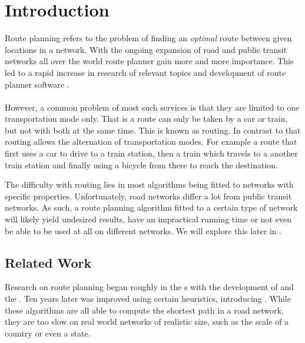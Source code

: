 \chapter{Introduction}\label{introduction}
	Route planning refers to the problem of finding an \textit{optimal} route between given locations in a network.
	With the ongoing expansion of road and public transit networks all over the world route planner gain more and
	more importance. This led to a rapid increase in research 
	of relevant topics and development of route planner software .\\\\
	However, a common problem of most such services is that they are limited to one transportation mode only.
	That is a route can only be taken by a car or train, but not with both at the same time. This is known as \uniModal routing.
	In contrast to that \multiModal routing allows the alternation of transportation modes. For example a route that
	first uses a car to drive to a train station, then a train which travels to a another train station and finally
	using a bicycle from there to reach the destination.
	
	The difficulty with \multiModal routing lies in most algorithms being fitted to networks with specific properties.
	Unfortunately, road networks differ a lot from public transit networks. As such, a route planning algorithm
	fitted to a certain type of network will likely yield undesired results, have an impractical running time or not
	even be able to be used at all on different networks. We will explore this later in .

\section{Related Work}
	Research on route planning began roughly in the s with the development of \dijkstra {} and the
	\bellmanFord {}. Ten years later \dijkstra was improved using certain heuristics, introducing \astar {}.
	While these algorithms are all able to compute the shortest path in a road network, they are too slow on real world networks of
	realistic size, such as the scale of a country or even a state.
	
